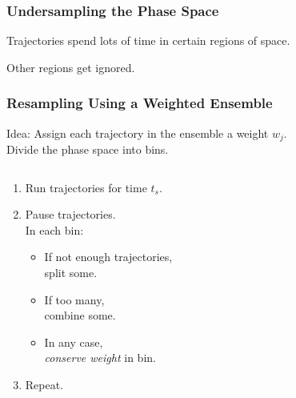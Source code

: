 \documentclass[xcolor={usenames,dvipsnames,svgnames}]{beamer}
\begin{document}
\begin{frame}
    \frametitle{Undersampling the Phase Space}
    Trajectories spend lots of time in certain regions of space.

    Other regions get ignored.

    \begin{center}
        
    \end{center}
\end{frame}

\begin{frame}
    \frametitle{Resampling Using a Weighted Ensemble}
    Idea: Assign each trajectory in the ensemble a weight $w_j$.\\
    Divide the phase space into bins.
    \begin{columns}[t]
        \begin{column}{0.5\textwidth}
            \begin{enumerate}
                \item<2-> Run trajectories for time $t_s$.
                \item<2-> Pause trajectories.\\
                    In each bin:
                \begin{itemize}
                    \item<3-> If not enough trajectories,\\
                        split some.
                    \item<4-> If too many,\\
                        combine some.
                    \item<5-> In any case,\\
                        \emph{conserve weight} in bin.
                \end{itemize}
                \item<6-> Repeat.
            \end{enumerate}
        \end{column}
        \begin{column}[T]{0.5\textwidth}
            \begin{center}
                \begin{overprint}
                    
                    
                    
                    
                    
                \end{overprint}
            \end{center}
        \end{column}
    \end{columns}
\end{frame}
\end{document}
